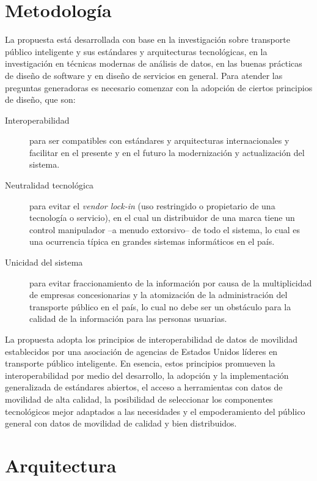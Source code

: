 \documentclass{report}
\begin{document}
\section{Metodología}

La propuesta está desarrollada con base en la investigación sobre transporte público inteligente y sus estándares y arquitecturas tecnológicas, en la investigación en técnicas modernas de análisis de datos, en las buenas prácticas de diseño de software y en diseño de servicios en general. Para atender las preguntas generadoras es necesario comenzar con la adopción de ciertos principios de diseño, que son:

\begin{description}
    \item[Interoperabilidad] para ser compatibles con estándares y arquitecturas internacionales \cite{davies2019state} y facilitar en el presente y en el futuro la modernización y actualización del sistema.
    \item[Neutralidad tecnológica] para evitar el \textit{vendor lock-in} (uso restringido o propietario de una tecnología o servicio), en el cual un distribuidor de una marca tiene un control manipulador –a menudo extorsivo– de todo el sistema, lo cual es una ocurrencia típica en grandes sistemas informáticos en el país.
    \item[Unicidad del sistema] para evitar fraccionamiento de la información por causa de la multiplicidad de empresas concesionarias y la atomización de la administración del transporte público en el país, lo cual no debe ser un obstáculo para la calidad de la información para las personas usuarias.
\end{description}

La propuesta adopta los principios de interoperabilidad de datos de movilidad  \cite{mdip2023modernizing} establecidos por una asociación de agencias de Estados Unidos líderes en transporte público inteligente. En esencia, estos principios promueven la interoperabilidad por medio del desarrollo, la adopción y la implementación generalizada de estándares abiertos, el acceso a herramientas con datos de movilidad de alta calidad, la posibilidad de seleccionar los componentes tecnológicos mejor adaptados a las necesidades y el empoderamiento del público general con datos de movilidad de calidad y bien distribuidos.


\section{Arquitectura}
\end{document}
